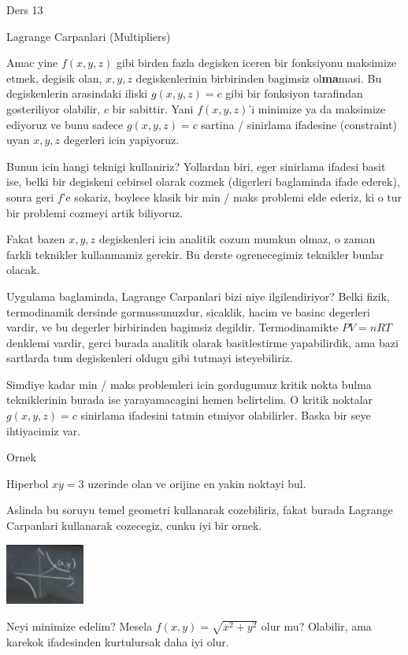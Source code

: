 \documentclass[12pt,fleqn]{article}\usepackage{../common}
\begin{document}
Ders 13

Lagrange Carpanlari (Multipliers)

Amac yine $f(x,y,z)$ gibi birden fazla degisken iceren bir fonksiyonu
maksimize etmek, degisik olan, $x,y,z$ degiskenlerinin birbirinden bagimsiz
ol\textbf{ma}masi. Bu degiskenlerin arasindaki iliski $g(x,y,z)=c$ gibi bir
fonksiyon tarafindan gosteriliyor olabilir, $c$ bir sabittir. Yani
$f(x,y,z)$'i minimize ya da maksimize ediyoruz ve bunu sadece $g(x,y,z)=c$
sartina / sinirlama ifadesine (constraint) uyan $x,y,z$ degerleri icin
yapiyoruz.

Bunun icin hangi teknigi kullaniriz? Yollardan biri, eger sinirlama ifadesi
basit ise, belki bir degiskeni cebirsel olarak cozmek (digerleri
baglaminda ifade ederek), sonra geri $f$'e sokariz, boylece klasik bir min
/ maks problemi elde ederiz, ki o tur bir problemi cozmeyi artik biliyoruz.

Fakat bazen $x,y,z$ degiskenleri icin analitik cozum mumkun olmaz, o zaman
farkli teknikler kullanmamiz gerekir. Bu derste ogrenecegimiz teknikler
bunlar olacak. 

Uygulama baglaminda, Lagrange Carpanlari bizi niye ilgilendiriyor? Belki
fizik, termodinamik dersinde gormussunuzdur, sicaklik, hacim ve basinc
degerleri vardir, ve bu degerler birbirinden bagimsiz
degildir. Termodinamikte $PV=nRT$ denklemi vardir, gerci burada analitik
olarak basitlestirme yapabilirdik, ama bazi sartlarda tum degiskenleri
oldugu gibi tutmayi isteyebiliriz. 

Simdiye kadar min / maks problemleri icin gordugumuz kritik nokta bulma
tekniklerinin burada ise yarayamacagini hemen belirtelim. O kritik noktalar
$g(x,y,z)=c$ sinirlama ifadesini tatmin etmiyor olabilirler. Baska bir seye
ihtiyacimiz var. 

Ornek

Hiperbol $xy =3$ uzerinde olan ve orijine en yakin noktayi bul. 

Aslinda bu soruyu temel geometri kullanarak cozebiliriz, fakat burada
Lagrange Carpanlari kullanarak cozecegiz, cunku iyi bir ornek. 

\includegraphics[height=2cm]{13_1.png}

Neyi minimize edelim? Mesela $f(x,y) = \sqrt{x^2 + y^2}$ olur mu? Olabilir,
ama karekok ifadesinden kurtulursak daha iyi olur. 
\end{document}
